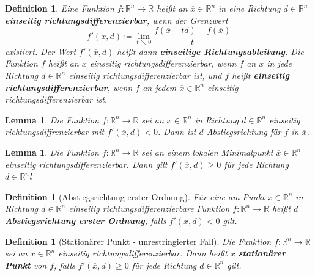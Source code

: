 \documentclass[11pt]{scrreprt}
\newcounter{thm}
\theoremstyle{thmstyle}
\numberwithin{thm}{section}
\newtheorem{definition}[thm]{Definition}
\newtheorem{lemma}[thm]{Lemma}
\begin{document}
\begin{definition}
	Eine Funktion $f \colon \mathbb{R}^n \rightarrow \mathbb{R}$ heißt an $\overline{x} \in \mathbb{R}^n$ in eine Richtung $d \in \mathbb{R}^n$ \textbf{einseitig richtungsdifferenzierbar}, wenn der Grenzwert
	$$ f'(\overline{x}, d) \coloneqq \lim_{t \searrow 0} \frac{f(\overline{x} + td) - f(\overline{x})}{t} $$
	existiert. Der Wert $f'(\overline{x}, d)$ heißt dann \textbf{einseitige Richtungsableitung}. Die Funktion $f$ heißt an $\overline{x}$ einseitig richtungsdifferenzierbar, wenn $f$ an $\overline{x}$ in jede Richtung $d \in \mathbb{R}^n$ einseitig richtungsdifferenzierbar ist, und $f$ heißt \textbf{einseitig richtungsdifferenzierbar}, wenn $f$ an jedem $\overline{x} \in \mathbb{R}^n$ einseitig richtungsdifferenzierbar ist.
\end{definition}

\begin{lemma}
	Die Funktion $f \colon \mathbb{R}^n \rightarrow \mathbb{R}$ sei an $\overline{x} \in \mathbb{R}^n$ in Richtung $d \in \mathbb{R}^n$ einseitig richtungsdiffrenzierbar mit $f'(\overline{x}, d) < 0$. Dann ist $d$ Abstiegsrichtung für $f$ in $\overline{x}$.	
\end{lemma}

\begin{lemma}
	Die Funktion $f \colon \mathbb{R}^n \rightarrow \mathbb{R}$ sei an einem lokalen Minimalpunkt $\overline{x} \in \mathbb{R}^n$ einseitig richtungsdifferenzierbar. Dann gilt $f'(\overline{x}, d) \geq 0$ für jede Richtung $d \in \mathbb{R}^n$l
\end{lemma}

\begin{definition}[Abstiegsrichtung erster Ordnung]
	Für eine am Punkt $\overline{x} \in \mathbb{R}^n$ in Richtung $d \in \mathbb{R}^n$ einseitig richtungsdifferenzierbare Funktion $f \colon \mathbb{R}^n \rightarrow \mathbb{R}$ heißt $d$ \textbf{Abstiegsrichtung erster Ordnung}, falls $f'(\overline{x}, d) < 0$ gilt.	
\end{definition}

\begin{definition}[Stationärer Punkt - unrestringierter Fall]
	Die Funktion $f \colon \mathbb{R}^n \rightarrow \mathbb{R}$ sei an $\overline{x} \in \mathbb{R}^n$ einseitig richtungsdifferenzierbar. Dann heißt $\overline{x}$ \textbf{stationärer Punkt} von $f$, falls $f'(\overline{x}, d) \geq 0$ für jede Richtung $d \in \mathbb{R}^n$ gilt.
\end{definition}
\end{document}
